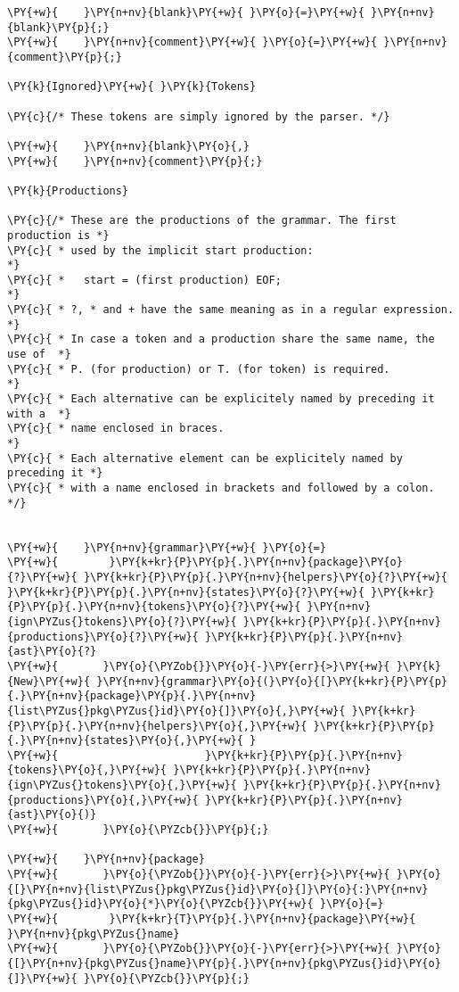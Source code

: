 \begin{Verbatim}[commandchars=\\\{\}]
\PY{+w}{    }\PY{n+nv}{blank}\PY{+w}{ }\PY{o}{=}\PY{+w}{ }\PY{n+nv}{blank}\PY{p}{;}
\PY{+w}{    }\PY{n+nv}{comment}\PY{+w}{ }\PY{o}{=}\PY{+w}{ }\PY{n+nv}{comment}\PY{p}{;}

\PY{k}{Ignored}\PY{+w}{ }\PY{k}{Tokens}

\PY{c}{/* These tokens are simply ignored by the parser. */}

\PY{+w}{    }\PY{n+nv}{blank}\PY{o}{,}
\PY{+w}{    }\PY{n+nv}{comment}\PY{p}{;}

\PY{k}{Productions}

\PY{c}{/* These are the productions of the grammar. The first production is *}
\PY{c}{ * used by the implicit start production:                            *}
\PY{c}{ *   start = (first production) EOF;                                 *}
\PY{c}{ * ?, * and + have the same meaning as in a regular expression.      *}
\PY{c}{ * In case a token and a production share the same name, the use of  *}
\PY{c}{ * P. (for production) or T. (for token) is required.                *}
\PY{c}{ * Each alternative can be explicitely named by preceding it with a  *}
\PY{c}{ * name enclosed in braces.                                          *}
\PY{c}{ * Each alternative element can be explicitely named by preceding it *}
\PY{c}{ * with a name enclosed in brackets and followed by a colon.         */}


\PY{+w}{    }\PY{n+nv}{grammar}\PY{+w}{ }\PY{o}{=}
\PY{+w}{        }\PY{k+kr}{P}\PY{p}{.}\PY{n+nv}{package}\PY{o}{?}\PY{+w}{ }\PY{k+kr}{P}\PY{p}{.}\PY{n+nv}{helpers}\PY{o}{?}\PY{+w}{ }\PY{k+kr}{P}\PY{p}{.}\PY{n+nv}{states}\PY{o}{?}\PY{+w}{ }\PY{k+kr}{P}\PY{p}{.}\PY{n+nv}{tokens}\PY{o}{?}\PY{+w}{ }\PY{n+nv}{ign\PYZus{}tokens}\PY{o}{?}\PY{+w}{ }\PY{k+kr}{P}\PY{p}{.}\PY{n+nv}{productions}\PY{o}{?}\PY{+w}{ }\PY{k+kr}{P}\PY{p}{.}\PY{n+nv}{ast}\PY{o}{?}
\PY{+w}{	   }\PY{o}{\PYZob{}}\PY{o}{-}\PY{err}{>}\PY{+w}{ }\PY{k}{New}\PY{+w}{ }\PY{n+nv}{grammar}\PY{o}{(}\PY{o}{[}\PY{k+kr}{P}\PY{p}{.}\PY{n+nv}{package}\PY{p}{.}\PY{n+nv}{list\PYZus{}pkg\PYZus{}id}\PY{o}{]}\PY{o}{,}\PY{+w}{ }\PY{k+kr}{P}\PY{p}{.}\PY{n+nv}{helpers}\PY{o}{,}\PY{+w}{ }\PY{k+kr}{P}\PY{p}{.}\PY{n+nv}{states}\PY{o}{,}\PY{+w}{ }
\PY{+w}{	                   }\PY{k+kr}{P}\PY{p}{.}\PY{n+nv}{tokens}\PY{o}{,}\PY{+w}{ }\PY{k+kr}{P}\PY{p}{.}\PY{n+nv}{ign\PYZus{}tokens}\PY{o}{,}\PY{+w}{ }\PY{k+kr}{P}\PY{p}{.}\PY{n+nv}{productions}\PY{o}{,}\PY{+w}{ }\PY{k+kr}{P}\PY{p}{.}\PY{n+nv}{ast}\PY{o}{)}
\PY{+w}{	   }\PY{o}{\PYZcb{}}\PY{p}{;}

\PY{+w}{    }\PY{n+nv}{package}
\PY{+w}{	   }\PY{o}{\PYZob{}}\PY{o}{-}\PY{err}{>}\PY{+w}{ }\PY{o}{[}\PY{n+nv}{list\PYZus{}pkg\PYZus{}id}\PY{o}{]}\PY{o}{:}\PY{n+nv}{pkg\PYZus{}id}\PY{o}{*}\PY{o}{\PYZcb{}}\PY{+w}{ }\PY{o}{=}
\PY{+w}{        }\PY{k+kr}{T}\PY{p}{.}\PY{n+nv}{package}\PY{+w}{ }\PY{n+nv}{pkg\PYZus{}name}
\PY{+w}{	   }\PY{o}{\PYZob{}}\PY{o}{-}\PY{err}{>}\PY{+w}{ }\PY{o}{[}\PY{n+nv}{pkg\PYZus{}name}\PY{p}{.}\PY{n+nv}{pkg\PYZus{}id}\PY{o}{]}\PY{+w}{ }\PY{o}{\PYZcb{}}\PY{p}{;}


\end{Verbatim}

